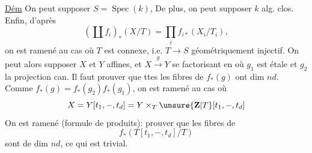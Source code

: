 \uline{Dém} On peut supposer $S=\operatorname{Spec}(k)$, De plus, on peut supposer $k$ alg. clos. Enfin, d'après
\[
(\coprod f_i)_*(X/T)=\prod_i f_{i*}(X_i/T_i),
\]
on est ramené au cas où $T$ est connexe, i.e. $T\to S$ géométriquement injectif. On peut alors supposer $X$ et $Y$ affines, et $X\xrightarrow{g}Y$  se factorisant en
où $g_1$ est étale et $g_2$ la projection can.
  Il faut prouver que ttes les fibres de $f_*(g)$ ont dim $nd$.
Comme $f_*(g)=f_*(g_2)f_*(g_1)$,  on est ramené au cas où
\[
X=Y[t_1,-,t_d]=Y\times_T\unsure{\mathbf Z|T}[t_1,-,t_d]
\]
\deleted{\unsure{où} $\unsure{Z|2}=T[t$}
On est ramené (formule de produits): prouver que les fibres de
\[
f_*(T[t_1,-,t_d]/T)
\]
sont de dim $nd$, ce qui est trivial.

